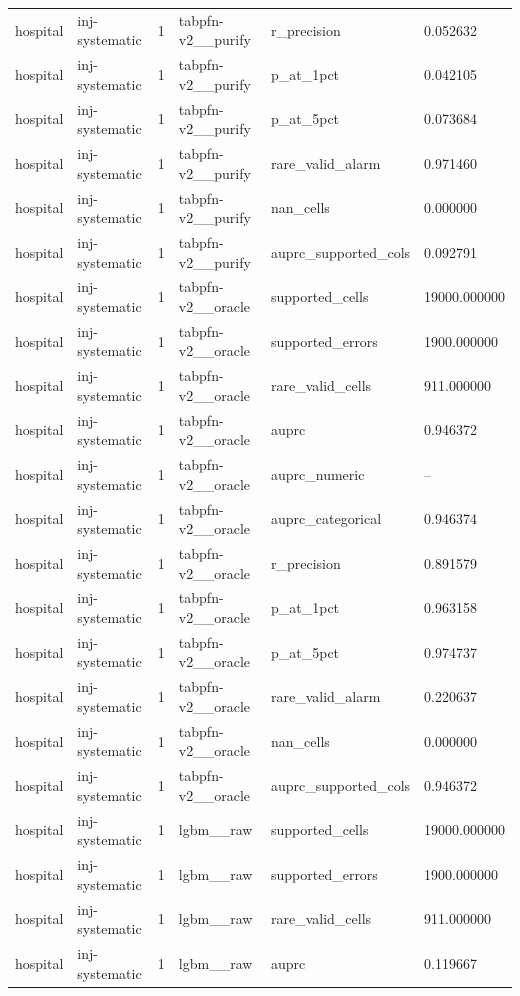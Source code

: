 \begin{tabular}{llllll}
hospital & inj-systematic & 1 & tabpfn-v2\_\_purify & r\_precision & 0.052632 \\
hospital & inj-systematic & 1 & tabpfn-v2\_\_purify & p\_at\_1pct & 0.042105 \\
hospital & inj-systematic & 1 & tabpfn-v2\_\_purify & p\_at\_5pct & 0.073684 \\
hospital & inj-systematic & 1 & tabpfn-v2\_\_purify & rare\_valid\_alarm & 0.971460 \\
hospital & inj-systematic & 1 & tabpfn-v2\_\_purify & nan\_cells & 0.000000 \\
hospital & inj-systematic & 1 & tabpfn-v2\_\_purify & auprc\_supported\_cols & 0.092791 \\
hospital & inj-systematic & 1 & tabpfn-v2\_\_oracle & supported\_cells & 19000.000000 \\
hospital & inj-systematic & 1 & tabpfn-v2\_\_oracle & supported\_errors & 1900.000000 \\
hospital & inj-systematic & 1 & tabpfn-v2\_\_oracle & rare\_valid\_cells & 911.000000 \\
hospital & inj-systematic & 1 & tabpfn-v2\_\_oracle & auprc & 0.946372 \\
hospital & inj-systematic & 1 & tabpfn-v2\_\_oracle & auprc\_numeric & -- \\
hospital & inj-systematic & 1 & tabpfn-v2\_\_oracle & auprc\_categorical & 0.946374 \\
hospital & inj-systematic & 1 & tabpfn-v2\_\_oracle & r\_precision & 0.891579 \\
hospital & inj-systematic & 1 & tabpfn-v2\_\_oracle & p\_at\_1pct & 0.963158 \\
hospital & inj-systematic & 1 & tabpfn-v2\_\_oracle & p\_at\_5pct & 0.974737 \\
hospital & inj-systematic & 1 & tabpfn-v2\_\_oracle & rare\_valid\_alarm & 0.220637 \\
hospital & inj-systematic & 1 & tabpfn-v2\_\_oracle & nan\_cells & 0.000000 \\
hospital & inj-systematic & 1 & tabpfn-v2\_\_oracle & auprc\_supported\_cols & 0.946372 \\
hospital & inj-systematic & 1 & lgbm\_\_raw & supported\_cells & 19000.000000 \\
hospital & inj-systematic & 1 & lgbm\_\_raw & supported\_errors & 1900.000000 \\
hospital & inj-systematic & 1 & lgbm\_\_raw & rare\_valid\_cells & 911.000000 \\
hospital & inj-systematic & 1 & lgbm\_\_raw & auprc & 0.119667 \\

\end{tabular}
